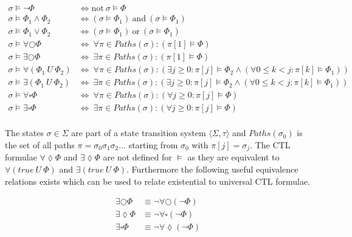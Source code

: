 \documentclass[11pt,a4paper,titlepage]{article}
\begin{document}
\begin{align*}
    \sigma \models \neg \Phi  &\iff \text{not} \ \sigma \models \Phi \\ 
    \sigma \models \Phi_1 \land \Phi_2   &\iff (\sigma \models \Phi_1) \ \text{and} \ (\sigma \models \Phi_1) \\ 
    \sigma \models \Phi_1 \lor \Phi_2   &\iff (\sigma \models \Phi_1) \ \text{or} \ (\sigma \models \Phi_1) \\ 
    \sigma \models \forall\bigcirc\Phi &\iff \ \forall \pi \in Paths(\sigma) \colon (\pi [1] \models \Phi) \\ 
    \sigma \models \exists\bigcirc\Phi &\iff \ \exists \pi \in Paths(\sigma) \colon (\pi [1] \models \Phi) \\ 
    \sigma \models \forall(\Phi_1 \ U \ \Phi_2) &\iff \ \forall \pi \in Paths(\sigma) \colon 
    (\exists j \geq 0 \colon \pi[j] \models \Phi_2 \land (\forall 0 \leq k < j \colon \pi[k] \models \Phi_1)) \\ 
    \sigma \models \exists(\Phi_1 \ U \ \Phi_2) &\iff \ \exists \pi \in Paths(\sigma) \colon 
    (\exists j \geq 0 \colon \pi[j] \models \Phi_2 \land (\forall 0 \leq k < j \colon \pi[k] \models \Phi_1)) \\ 
    \sigma \models \forall\square\Phi &\iff \ \forall \pi \in Paths(\sigma) \colon (\forall j \geq 0 \colon \pi[j] \models \Phi) \\ 
    \sigma \models \exists\square\Phi &\iff \ \exists \pi \in Paths(\sigma) \colon (\forall j \geq 0 \colon \pi[j] \models \Phi) \\ 
\end{align*}

The states $\sigma \in \Sigma$ are part of a state transition system $\langle \Sigma, \tau \rangle$ and 
$Paths(\sigma_0)$ is the set of all paths $\pi = \sigma_0 \sigma_1 \sigma_2 \dots$ starting from $\sigma_0$ with $\pi[j] = \sigma_j$.
The CTL formulae $\forall\lozenge\Phi$ and $\exists\lozenge\Phi$ are not defined for $\models$ as they are equivalent to 
$\forall(true \ U \ \Phi)$ and $\exists(true \ U \ \Phi)$. Furthermore the following useful equivalence relations 
exists which can be used to relate existential to universal CTL formulae.

\begin{align*}
    \exists\bigcirc\Phi &\equiv \neg \forall\bigcirc(\neg \Phi)\\ 
    \exists\lozenge\Phi &\equiv \neg \forall\square(\neg \Phi) \\
    \exists\square\Phi  &\equiv \neg \forall\lozenge(\neg \Phi) \\
\end{align*}
\end{document}
